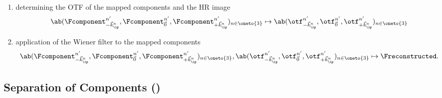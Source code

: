 \begin{enumerate}[label=\roman*.]
\begin{equation*}
        \end{equation*}
    \item {} determining the \ac{OTF} of the mapped components and the \ac{HR} image 
        \begin{equation*}
            \ab(\Fcomponent_{-\vec{k}^{n}_\ip}^{n'}, \Fcomponent_{\vec{0}}^{n'}, \Fcomponent_{+\vec{k}^{n}_\ip}^{n'})_{n \in \oneto{3}}
            \mapsto \ab(\otf^{n'}_{-\vec{k}^{n}_\ip}, \otf^{n'}_{\vec{0}}, \otf^{n'}_{+\vec{k}^{n}_\ip})_{n \in \oneto{3}}
        \end{equation*}
    \item {} application of the Wiener filter to the mapped components 
        \begin{equation*}
            \ab(\Fcomponent_{-\vec{k}^{n}_\ip}^{n'}, \Fcomponent_{\vec{0}}^{n'}, \Fcomponent_{+\vec{k}^{n}_\ip}^{n'})_{n \in
           \oneto{3}},
           \ab(\otf^{n'}_{-\vec{k}^{n}_\ip}, \otf^{n'}_{\vec{0}}, \otf^{n'}_{+\vec{k}^{n}_\ip})_{n \in \oneto{3}}
            \mapsto \Freconstructed.
        \end{equation*}
\end{enumerate}

\subsection{Separation of Components ()}

